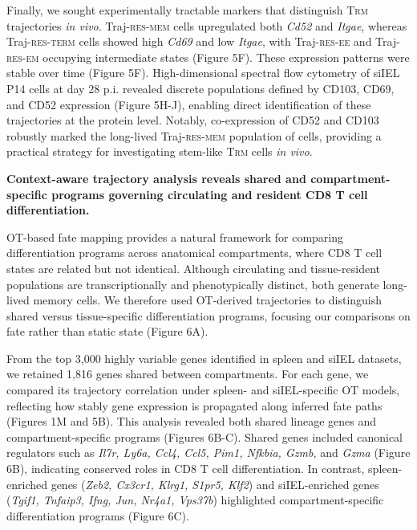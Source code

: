 Finally, we sought experimentally tractable markers that distinguish
T\textsc{rm} trajectories \emph{in vivo}. Traj-\textsc{res-mem} cells
upregulated both \emph{Cd52} and \emph{Itgae}, whereas
Traj-\textsc{res-term} cells showed high \emph{Cd69} and low
\emph{Itgae}, with Traj-\textsc{res-ee} and Traj-\textsc{res-em}
occupying intermediate states (Figure 5F). These expression patterns
were stable over time (Figure 5F). High-dimensional spectral flow
cytometry of siIEL P14 cells at day 28 p.i. revealed discrete
populations defined by CD103, CD69, and CD52 expression (Figure 5H-J),
enabling direct identification of these trajectories at the protein
level. Notably, co-expression of CD52 and CD103 robustly marked the
long-lived Traj-\textsc{res-mem} population of cells, providing a
practical strategy for investigating stem-like T\textsc{rm} cells
\emph{in vivo}.

\textbf{Context-aware trajectory analysis reveals shared and
compartment-specific programs governing circulating and resident CD8 T
cell differentiation. }

OT-based fate mapping provides a natural framework for comparing
differentiation programs across anatomical compartments, where CD8 T
cell states are related but not identical. Although circulating and
tissue-resident populations are transcriptionally and phenotypically
distinct, both generate long-lived memory cells. We therefore used
OT-derived trajectories to distinguish shared versus tissue-specific
differentiation programs, focusing our comparisons on fate rather than
static state (Figure 6A).

From the top 3,000 highly variable genes identified in spleen and siIEL
datasets, we retained 1,816 genes shared between compartments. For each
gene, we compared its trajectory correlation under spleen- and
siIEL-specific OT models, reflecting how stably gene expression is
propagated along inferred fate paths (Figures 1M and 5B). This analysis
revealed both shared lineage genes and compartment-specific programs
(Figures 6B-C). Shared genes included canonical regulators such as
\emph{Il7r, Ly6a, Ccl4, Ccl5, Pim1, Nfkbia, Gzmb,} and \emph{Gzma}
(Figure 6B), indicating conserved roles in CD8 T cell differentiation.
In contrast, spleen-enriched genes (\emph{Zeb2, Cx3cr1, Klrg1, S1pr5,
Klf2}) and siIEL-enriched genes (\emph{Tgif1, Tnfaip3, Ifng, Jun, Nr4a1,
Vps37b}) highlighted compartment-specific differentiation programs
(Figure 6C).

